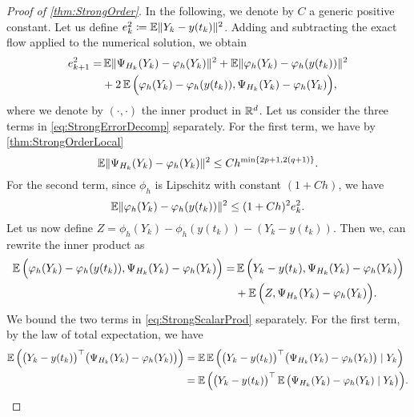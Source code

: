 \documentclass[10pt]{article}
\begin{document}
\begin{proof}[Proof of \cref{thm:StrongOrder}] In the following, we denote by $C$ a generic positive constant. Let us define $e_k^2 \coloneqq \operatorname{\mathbb{E}}\lVert Y_k - y(t_k)\rVert^2$. Adding and subtracting the exact flow applied to the numerical solution, we obtain
	\begin{equation}\label{eq:StrongErrorDecomp}
		\begin{aligned}
			e_{k+1}^2 = &\operatorname{\mathbb{E}}\lVert\Psi_{H_k}(Y_k) - \varphi_{h}(Y_k)\rVert^2 + \operatorname{\mathbb{E}}\lVert\varphi_{h}(Y_k) - \varphi_{h}(y(t_k))\rVert^2 \\
					  &+ 2\operatorname{\mathbb{E}}\Big(\varphi_{h}(Y_k) - \varphi_{h}(y(t_k)), \Psi_{H_k}(Y_k) - \varphi_{h}(Y_k)\Big),
		\end{aligned}
	\end{equation}
	where we denote by $(\cdot, \cdot)$ the inner product in $\mathbb{R}^d$. Let us consider the three terms in \eqref{eq:StrongErrorDecomp} separately. For the first term, we have by \cref{thm:StrongOrderLocal}
	\begin{equation}\label{eq:StrongFirstTerm}
		\operatorname{\mathbb{E}}\lVert\Psi_{H_k}(Y_k) - \varphi_{h}(Y_k)\rVert^2 \leq Ch^{\min\{2p+1, 2(q+1)\}}.
	\end{equation}
    For the second term, since $\phi_h$ is Lipschitz with constant $(1 + Ch)$, we have
	\begin{equation}\label{eq:StrongSecondTerm}
		\operatorname{\mathbb{E}}\lVert\varphi_{h}(Y_k) - \varphi_{h}(y(t_k))\rVert^2 \leq (1 + Ch)^2 e_k^2.
	\end{equation}
	Let us now define $Z = \phi_{h}(Y_k) - \phi_{h}(y(t_k)) - (Y_k - y(t_k))$. Then we, can rewrite the inner product as
	\begin{equation}\label{eq:StrongScalarProd}
	\begin{aligned}
		\operatorname{\mathbb{E}}\Big(\varphi_{h}(Y_k) - \varphi_{h}(y(t_k)), \Psi_{H_k}(Y_k) - \varphi_{h}(Y_k)\Big) = &\operatorname{\mathbb{E}}\Big(Y_k - y(t_k), \Psi_{H_k}(Y_k) - \varphi_{h}(Y_k)\Big) \\
		&+ \operatorname{\mathbb{E}}\Big(Z, \Psi_{H_k}(Y_k) - \varphi_{h}(Y_k)\Big).
	\end{aligned}
	\end{equation}
	We bound the two terms in \eqref{eq:StrongScalarProd} separately. For the first term, by the law of total expectation, we have
	\begin{equation}
	\begin{aligned}
		\E\Big(\big(Y_k - y(t_k)\big)^\top \big(\Psi_{H_k}(Y_k) - \phi_{h}(Y_k)\big)\Big) &= \E\E\Big(\big(Y_k - y(t_k)\big)^\top \big(\Psi_{H_k}(Y_k) - \phi_{h}(Y_k)\big) \mid Y_k\Big)\\
		&= \E\Big(\big(Y_k - y(t_k)\big)^\top\E \big(\Psi_{H_k}(Y_k) - \phi_{h}(Y_k) \mid Y_k \big)\Big).

\end{aligned}
\end{equation}
\end{proof}
\end{document}
